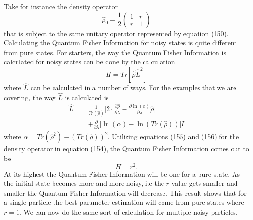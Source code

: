 \documentclass[twocolumn]{article}
\begin{document}
Take for instance the density operator
\begin{equation}
\hat{\rho}_0=\frac{1}{2}
\begin{pmatrix}
1 & r \\
r & 1
\end{pmatrix}
\end{equation}
that is subject to the same unitary operator represented by equation (150). Calculating the Quantum Fisher Information for noisy states is quite different from pure states. For starters, the way the Quantum Fisher Information is calculated for noisy states can be done by the calculation
\begin{equation}
H=Tr[\hat{\rho}\hat{L}^2]
\end{equation}
where $\hat{L}$ can be calculated in a number of ways. For the examples that we are covering, the way $\hat{L}$ is calculated is
\begin{align}
\hat{L}=&\frac{1}{Tr(\hat{\rho})}\Big[2\cdot\frac{\partial\hat{\rho}}{\partial\lambda}-\frac{\partial \ln(\alpha)}{\partial\lambda}\hat{\rho}\Big] \nonumber \\
&+\frac{\partial}{\partial\lambda}\Big[\ln(\alpha)-\ln(Tr(\hat{\rho}))\Big]\hat{I}
\end{align}
where $\alpha=Tr{(\hat{\rho}^2)}-(Tr(\hat{\rho}))^2$. Utilizing equations (155) and (156) for the density operator in equation (154), the Quantum Fisher Information comes out to be 
\begin{equation}
H=r^2.
\end{equation}
At its highest the Quantum Fisher Information will be one for a pure state. As the initial state becomes more and more noisy, i.e the $r$ value gets smaller and smaller the Quantum Fisher Information will decrease. This result shows that for a single particle the best parameter estimation will come from pure states where $r=1$. We can now do the same sort of calculation for multiple noisy particles. 
\end{document}
